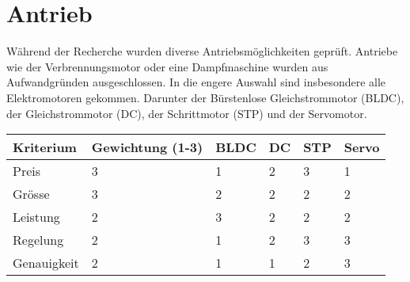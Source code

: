 \section{Antrieb}

Während der Recherche wurden diverse Antriebsmöglichkeiten geprüft.
Antriebe wie der Verbrennungsmotor oder eine Dampfmaschine wurden aus Aufwandgründen ausgeschlossen.
In die engere Auswahl sind insbesondere alle Elektromotoren gekommen.
Darunter der Bürstenlose Gleichstrommotor (BLDC), der Gleichstrommotor (DC), der Schrittmotor (STP) und der Servomotor.


\begin{table}[h]
\begin{tabular}{|p{4.5cm}|p{3.5cm}|p{1.25cm}|p{1.25cm}|p{1.25cm}|p{1.25cm}|}\hline
	
	\textbf{Kriterium}	& 	\textbf{Gewichtung (1-3)} & \textbf{BLDC} & \textbf{DC} & \textbf{STP}& \textbf{Servo}\\\hline
	{Preis}	& 	{3} & {1} & {2} & {3}& {1}\\\hline
	{Grösse}	& 	{3} & {2} & {2} & {2}& {2}\\\hline
	{Leistung}	& 	{2} & {3} & {2} & {2}& {2}\\\hline
	{Regelung}	& 	{2} & {1} & {2} & {3}& {3}\\\hline
	{Genauigkeit}	& 	{2} & {1} & {1} & {2}& {3}\\\hline
	
	
	
	
\end{tabular}\\
\end{table}